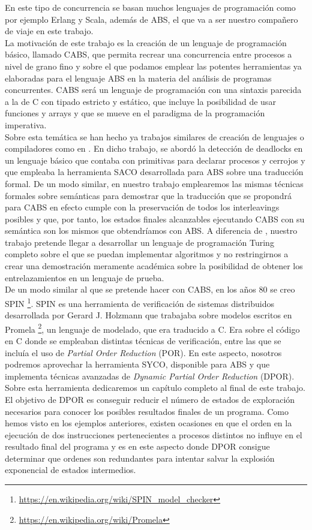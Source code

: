 En este tipo de concurrencia se basan muchos lenguajes de programación como por ejemplo Erlang y Scala, además de ABS, el que va a ser nuestro compañero de viaje en este trabajo.\\

La motivación de este trabajo es la creación de un lenguaje de programación básico, llamado CABS, que permita recrear una concurrencia entre procesos a nivel de grano fino y sobre el que podamos emplear las potentes herramientas ya elaboradas para el lenguaje ABS en la materia del análisis de programas concurrentes. CABS será un lenguaje de programación con una sintaxis parecida a la de C con tipado estricto y estático, que incluye la posibilidad de usar funciones y arrays y que se mueve en el paradigma de la programación imperativa.\\

Sobre esta temática se han hecho ya trabajos similares de creación de lenguajes o compiladores como en \cite{Alicia}. En dicho trabajo, se abordó la detección de deadlocks en un lenguaje básico que contaba con primitivas para declarar procesos y cerrojos y que empleaba la herramienta SACO desarrollada para ABS sobre una traducción formal. De un modo similar, en nuestro trabajo emplearemos las mismas técnicas formales sobre semánticas para demostrar que la traducción que se propondrá para CABS en efecto cumple con la preservación de todos los interleavings posibles y que, por tanto, los estados finales alcanzables ejecutando CABS con su semántica son los mismos que obtendríamos con ABS. A diferencia de \cite{Alicia}, nuestro trabajo pretende llegar a desarrollar un lenguaje de programación Turing completo sobre el que se puedan implementar algoritmos y no restringirnos a crear una demostración meramente académica sobre la posibilidad de obtener los entrelazamientos en un lenguaje de prueba.\\

De un modo similar al que se pretende hacer con CABS, en los años 80 se creo SPIN \footnote{\url{https://en.wikipedia.org/wiki/SPIN_model_checker}}. SPIN es una herramienta de verificación de sistemas distribuidos desarrollada por Gerard J. Holzmann que trabajaba sobre modelos escritos en Promela \footnote{\url{https://en.wikipedia.org/wiki/Promela}}, un lenguaje de modelado, que era traducido a C. Era sobre el código en C donde se empleaban distintas técnicas de verificación, entre las que se incluía el uso de \emph{Partial Order Reduction} (POR). En este aspecto, nosotros podremos aprovechar la herramienta SYCO, disponible para ABS y que implementa técnicas avanzadas de \emph{Dynamic Partial Order Reduction} (DPOR). Sobre esta herramienta dedicaremos un capítulo completo al final de este trabajo. El objetivo de DPOR es conseguir reducir el número de estados de exploración necesarios para conocer los posibles resultados finales de un programa. Como hemos visto en los ejemplos anteriores, existen ocasiones en que el orden en la ejecución de dos instrucciones pertenecientes a procesos distintos no influye en el resultado final del programa y es en este aspecto donde DPOR consigue determinar que ordenes son redundantes para intentar salvar la explosión exponencial de estados intermedios.\\

